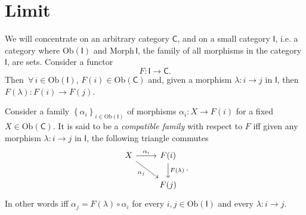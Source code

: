 \section{Limit}
We will concentrate on an arbitrary category $\mathsf{C}$,
and on a small category $\mathsf{I}$,
i.e. a category where $\mathrm{Ob} \left(\mathsf{I}\right)$ and $\mathrm{Morph}\, \mathsf{I}$,
the family of all morphisms in the category $\mathsf{I}$, are sets.
Consider a functor 
\begin{equation}
F: \mathsf{I} \to \mathsf{C}
.\end{equation} 
Then $\,\forall\, i \in \mathrm{Ob} \left(\mathsf{I}\right)$, $F(i) \in \mathrm{Ob} \left(\mathsf{C}\right)$ and,
given a morphism $\lambda: i \to j$ in $\mathsf{I}$, then $F(\lambda): F(i) \to F(j)$.

\begin{defn}
	Consider a family $\left\{ \alpha_i \right\}_{i \in \mathrm{Ob} \left(\mathsf{I}\right)}$ of morphisms 
	$\alpha_i: X \to F(i)$ for a fixed $X \in \mathrm{Ob} \left(\mathsf{C}\right)$.
	It is said to be a {\em compatible family} with respect to $F$ iff
	given any morphism $\lambda: i \to j$ in $\mathsf{I}$, the following triangle commutes
	\begin{equation}
	\begin{tikzcd}
		X \arrow[r, "\alpha_i", rightarrow] \arrow[rd, "\alpha_j"', rightarrow] &
		F(i) \arrow[d, "F(\lambda)", rightarrow] \\
		&
		F(j)
	\end{tikzcd}
	.\end{equation} 
	In other words iff $\alpha_j = F(\lambda) \circ \alpha_i$ for every $i, j \in \mathrm{Ob} \left(\mathsf{I}\right)$ and every $\lambda: i \to j$.
\end{defn}

